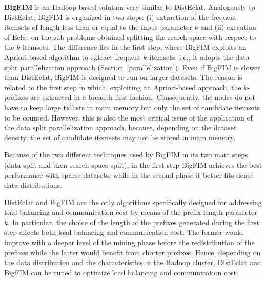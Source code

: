 {\bf BigFIM} is an Hadoop-based solution very similar to DistEclat. 
Analogously to DistEclat, BigFIM is organized in two steps: (i) extraction of the frequent itemsets 
of length less than or equal to the input parameter $k$ and (ii) execution of Eclat on the sub-problems obtained splitting the search space with respect 
to the $k$-itemsets. The difference lies in the first step, where BigFIM exploits an Apriori-based algorithm to extract frequent $k$-itemsets, i.e., it adopts the data split parallelization approach (Section~\ref{parallelization}). 
Even if BigFIM is slower than DistEclat, BigFIM is designed to run on larger datasets.
The reason is related to the first step in which, exploiting an Apriori-based approach,
the $k$-prefixes are extracted in a breadth-first fashion.  Consequently, the nodes do not have to keep large tidlists in main memory but only the set of candidate itemsets to be counted. However, this is also the most critical issue of the application of the data split parallelization approach, because, depending on the dataset density, the set of candidate itemsets may not be stored in main memory. 

Because of the two different techniques used by BigFIM in its two main steps (data split and then search space split), 
in the first step BigFIM achieves the best performance with sparse datasets, while in the second phase it better fits dense data distributions.

DistEclat and BigFIM are the only algorithms specifically designed for addressing 
load balancing and communication cost by means of the prefix length parameter $k$. 
In particular, the choice of the length of the prefixes
generated during the first step affects both load
balancing and communication cost. The former would
improve with a deeper level of the mining phase before the redistribution of the
prefixes while the latter would benefit from shorter prefixes. 
Hence, depending on the data distribution and the characteristics of the
Hadoop cluster, DistEclat and BigFIM can be tuned to optimize load balancing and communication
cost.




